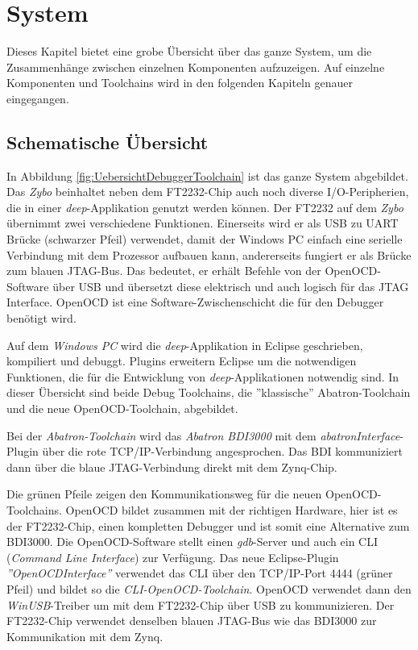 \chapter{System}
Dieses Kapitel bietet eine grobe Übersicht über das ganze System, um die Zusammenhänge zwischen einzelnen Komponenten aufzuzeigen.
Auf einzelne Komponenten und Toolchains wird in den folgenden Kapiteln genauer eingegangen.


\section{Schematische Übersicht}
In Abbildung \ref{fig:UebersichtDebuggerToolchain} ist das ganze System abgebildet.
Das \textit{Zybo} beinhaltet neben dem FT2232-Chip auch noch diverse I/O-Peripherien, die in einer \textit{deep}-Applikation genutzt werden können.
Der FT2232 auf dem \textit{Zybo} übernimmt zwei verschiedene Funktionen.
Einerseits wird er als USB zu UART Brücke (schwarzer Pfeil) verwendet, damit der Windows PC einfach eine serielle Verbindung mit dem Prozessor aufbauen kann, andererseits fungiert er als Brücke zum blauen JTAG-Bus.
Das bedeutet, er erhält Befehle von der OpenOCD-Software über USB und übersetzt diese elektrisch und auch logisch für das JTAG Interface.
OpenOCD ist eine Software-Zwischenschicht die für den Debugger benötigt wird.

Auf dem \textit{Windows PC} wird die \textit{deep}-Applikation in Eclipse geschrieben, kompiliert und debuggt.
Plugins erweitern Eclipse um die notwendigen Funktionen, die für die Entwicklung von \textit{deep}-Applikationen notwendig sind.
In dieser Übersicht sind beide Debug Toolchains, die ''klassische'' Abatron-Toolchain und die neue OpenOCD-Toolchain, abgebildet.

Bei der \textit{Abatron-Toolchain} wird das \textit{Abatron BDI3000} mit dem \textit{abatronInterface}-Plugin über die rote TCP/IP-Verbindung angesprochen.
Das BDI kommuniziert dann über die blaue JTAG-Verbindung direkt mit dem Zynq-Chip.

Die grünen Pfeile zeigen den Kommunikationsweg für die neuen OpenOCD-Toolchains.
OpenOCD bildet zusammen mit der richtigen Hardware, hier ist es der FT2232-Chip, einen kompletten Debugger und ist somit eine Alternative zum BDI3000.
Die OpenOCD-Software stellt einen \textit{gdb}-Server und auch ein CLI (\textit{Command Line Interface}) zur Verfügung.
Das neue Eclipse-Plugin \textit{''OpenOCDInterface''} verwendet das CLI über den TCP/IP-Port 4444 (grüner Pfeil) und bildet so die \textit{CLI-OpenOCD-Toolchain}.
OpenOCD verwendet dann den \textit{WinUSB}-Treiber um mit dem FT2232-Chip über USB zu kommunizieren.
Der FT2232-Chip verwendet denselben blauen JTAG-Bus wie das BDI3000 zur Kommunikation mit dem Zynq.

